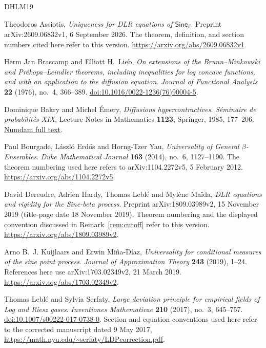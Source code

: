 \documentclass[11pt,reqno]{amsart}
\numberwithin{equation}{section}
\theoremstyle{definition}
\theoremstyle{remark}
\newcommand{\1}{\mathbf 1}
\begin{document}
\begin{thebibliography}{DHLM19}

Theodoros Assiotis,
\emph{Uniqueness for DLR equations of $\mathsf{Sine}_\beta$}.
Preprint arXiv:2609.06832v1, 6 September 2026.
The theorem, definition, and section numbers cited here refer to this version.
\url{https://arxiv.org/abs/2609.06832v1}.

Herm Jan Brascamp and Elliott H.~Lieb,
\emph{On extensions of the Brunn--Minkowski and Pr\'ekopa--Leindler
theorems, including inequalities for log concave functions, and with
an application to the diffusion equation}.
\emph{Journal of Functional Analysis} \textbf{22} (1976), no.~4,
366--389. \href{https://doi.org/10.1016/0022-1236(76)90004-5}
{doi:10.1016/0022-1236(76)90004-5}.

Dominique Bakry and Michel \'Emery,
\emph{Diffusions hypercontractives}.
\emph{S\'eminaire de probabilit\'es XIX}, Lecture Notes in Mathematics
\textbf{1123}, Springer, 1985, 177--206.
\href{https://www.numdam.org/item/SPS_1985__19__177_0/}
{Numdam full text}.


Paul Bourgade, L\'aszl\'o Erd\H{o}s and Horng-Tzer Yau,
\emph{Universality of General $\beta$-Ensembles}.
\emph{Duke Mathematical Journal} \textbf{163} (2014), no.~6,
1127--1190. The theorem numbering used here refers to
arXiv:1104.2272v5, 5 February 2012.
\url{https://arxiv.org/abs/1104.2272v5}.

David Dereudre, Adrien Hardy, Thomas Lebl\'e and Myl\`ene Ma\"ida,
\emph{DLR equations and rigidity for the Sine-beta process}.
Preprint arXiv:1809.03989v2, 15 November 2019
(title-page date 18 November 2019).
Theorem numbering and the displayed convention discussed in
Remark~\ref{rem:cutoff} refer to this version.
\url{https://arxiv.org/abs/1809.03989v2}.

Arno B.~J. Kuijlaars and Erwin Mi\~na-D\'iaz,
\emph{Universality for conditional measures of the sine point process}.
\emph{Journal of Approximation Theory} \textbf{243} (2019), 1--24.
References here use arXiv:1703.02349v2, 21 March 2019.
\url{https://arxiv.org/abs/1703.02349v2}.

Thomas Lebl\'e and Sylvia Serfaty,
\emph{Large deviation principle for empirical fields of Log and Riesz gases}.
\emph{Inventiones Mathematicae} \textbf{210} (2017), no.~3, 645--757.
\href{https://doi.org/10.1007/s00222-017-0738-0}
{doi:10.1007/s00222-017-0738-0}.
Section and equation conventions used here refer to the corrected
manuscript dated 9 May 2017,
\url{https://math.nyu.edu/~serfaty/LDPcorrection.pdf}.

\end{thebibliography}
\end{document}
